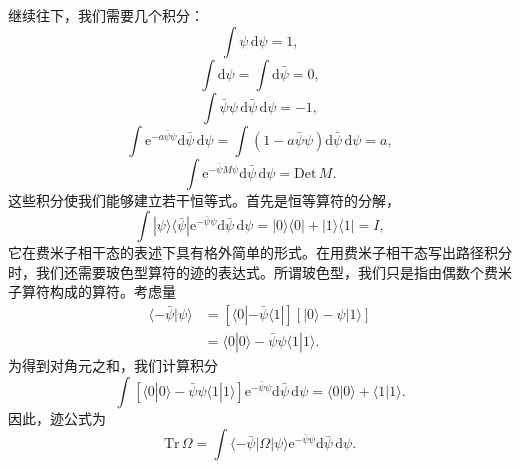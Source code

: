 继续往下，我们需要几个积分：
\begin{equation*}
\int\psi\,\mathrm d\psi=1, \tag{12.75}
\end{equation*}
\begin{equation*}
\int\mathrm d\psi=\int\mathrm d\bar\psi=0, \tag{12.76}
\end{equation*}
\begin{equation*}
\int\bar\psi\psi\,\mathrm d\bar\psi\,\mathrm d\psi=-1, \tag{12.77}
\end{equation*}
\begin{equation*}
\int\mathrm e^{-a\bar\psi\psi}\mathrm d\bar\psi\,\mathrm d\psi=\int\left(1-a\bar\psi\psi\right)\mathrm d\bar\psi\,\mathrm d\psi=a, \tag{12.78}
\end{equation*}
\begin{equation*}
\int\mathrm e^{-\bar\psi M\psi}\mathrm d\bar\psi\,\mathrm d\psi=\mathrm{Det}\,M. \tag{12.79}
\end{equation*}
这些积分使我们能够建立若干恒等式。首先是恒等算符的分解，
\begin{equation*}
\int|\psi\rangle\langle\bar\psi|\mathrm e^{-\bar\psi\psi}\mathrm d\bar\psi\,\mathrm d\psi=|0\rangle\langle 0|+|1\rangle\langle 1|=I, \tag{12.80}
\end{equation*}
它在费米子相干态的表述下具有格外简单的形式。在用费米子相干态写出路径积分时，我们还需要玻色型算符的迹的表达式。所谓玻色型，我们只是指由偶数个费米子算符构成的算符。考虑量
\begin{align*}
\langle-\bar\psi|\psi\rangle&=\left[\langle 0|-\bar\psi\langle 1|\right]\left[|0\rangle-\psi|1\rangle\right]\\
&=\langle 0|0\rangle-\bar\psi\psi\langle 1|1\rangle. \tag{12.81}
\end{align*}
为得到对角元之和，我们计算积分
\begin{equation*}
\int\left[\langle 0|0\rangle-\bar\psi\psi\langle 1|1\rangle\right]\mathrm e^{-\bar\psi\psi}\mathrm d\bar\psi\,\mathrm d\psi=\langle 0|0\rangle+\langle 1|1\rangle. \tag{12.82}
\end{equation*}
因此，迹公式为
\begin{equation*}
\mathrm{Tr}\,\Omega=\int\langle-\bar\psi|\Omega|\psi\rangle\mathrm e^{-\bar\psi\psi}\mathrm d\bar\psi\,\mathrm d\psi. \tag{12.83}
\end{equation*}

